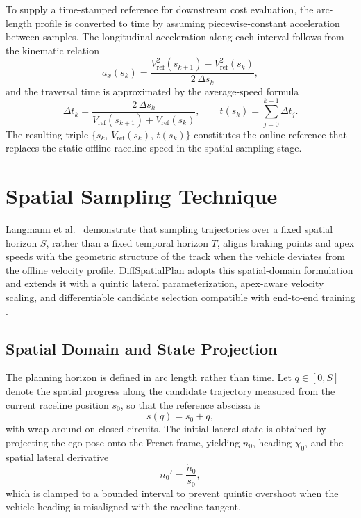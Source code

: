 To supply a time-stamped reference for downstream cost evaluation, the arc-length profile is converted to time by assuming piecewise-constant acceleration between samples.
The longitudinal acceleration along each interval follows from the kinematic relation
\begin{equation}
    a_x(s_k) = \frac{V_{\text{ref}}^2(s_{k+1}) - V_{\text{ref}}^2(s_k)}{2\,\Delta s_k},
    \label{eq:axProfile}
\end{equation}
and the traversal time is approximated by the average-speed formula
\begin{equation}
    \Delta t_k = \frac{2\,\Delta s_k}{V_{\text{ref}}(s_{k+1}) + V_{\text{ref}}(s_k)},
    \qquad
    t(s_k) = \sum_{j=0}^{k-1} \Delta t_j.
    \label{eq:timeProfile}
\end{equation}
The resulting triple $\{s_k,\, V_{\text{ref}}(s_k),\, t(s_k)\}$ constitutes the online reference that replaces the static offline raceline speed in the spatial sampling stage.

\section{Spatial Sampling Technique}
\label{section:SpatialSampling}

Langmann et al.\ \cite{langmann_OnlineVelocityProfile_2025} demonstrate that sampling trajectories over a fixed spatial horizon $S$, rather than a fixed temporal horizon $T$, aligns braking points and apex speeds with the geometric structure of the track when the vehicle deviates from the offline velocity profile.
DiffSpatialPlan adopts this spatial-domain formulation and extends it with a quintic lateral parameterization, apex-aware velocity scaling, and differentiable candidate selection compatible with end-to-end training \cite{koch_DifferentiableInterpretablePath_2025}.

\subsection{Spatial Domain and State Projection}

The planning horizon is defined in arc length rather than time.
Let $q \in [0, S]$ denote the spatial progress along the candidate trajectory measured from the current raceline position $s_0$, so that the reference abscissa is
\begin{equation}
    s(q) = s_0 + q,
    \label{eq:spatialProgress}
\end{equation}
with wrap-around on closed circuits.
The initial lateral state is obtained by projecting the ego pose onto the Frenet frame, yielding $n_0$, heading $\chi_0$, and the spatial lateral derivative
\begin{equation}
    n_0' = \frac{\dot{n}_0}{\dot{s}_0},
    \label{eq:nPrimeInit}
\end{equation}
which is clamped to a bounded interval to prevent quintic overshoot when the vehicle heading is misaligned with the raceline tangent.


